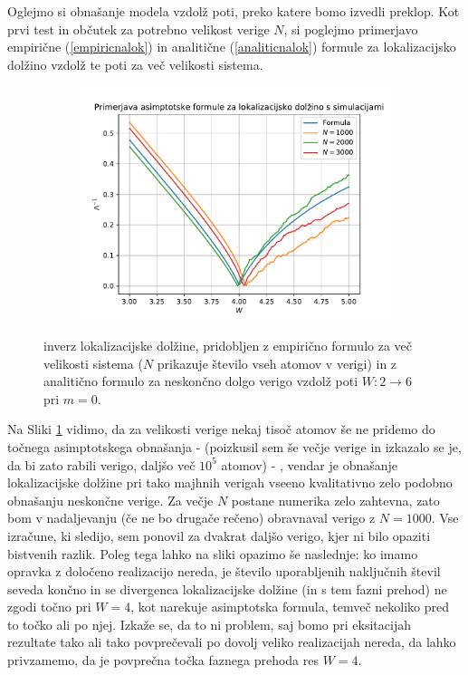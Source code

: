 Oglejmo si obnašanje modela vzdolž poti, preko katere bomo izvedli preklop. 
Kot prvi test in občutek za potrebno velikost verige $N$, si poglejmo primerjavo empirične (\ref{empiricnalok}) in analitične (\ref{analiticnalok}) formule za lokalizacijsko dolžino vzdolž te poti za več velikosti sistema.
\begin{figure}[H]
\centering
\begin{subfigure}{.7\textwidth}
\includegraphics[trim=0 0 0 38,clip,width=\linewidth]{Figures/locLength.pdf}
\end{subfigure}
\caption{inverz lokalizacijske dolžine, pridobljen z empirično formulo za več velikosti sistema ($N$ prikazuje število vseh atomov v verigi) in z analitično formulo za neskončno dolgo verigo vzdolž poti $W: 2 \to 6$ pri $m=0$.}
\label{fig:locLength}
\end{figure}
Na Sliki \ref{fig:locLength} vidimo, da za velikosti verige nekaj tisoč atomov še ne pridemo do točnega asimptotskega obnašanja - (poizkusil sem še večje verige in izkazalo se je, da bi zato rabili verigo, daljšo več $10^5$ atomov) - , vendar je obnašanje lokalizacijske dolžine pri tako majhnih verigah vseeno kvalitativno zelo podobno obnašanju neskončne verige. Za večje $N$ postane numerika zelo zahtevna, zato bom v nadaljevanju (če ne bo drugače rečeno) obravnaval verigo z $N=1000$. Vse izračune, ki sledijo, sem ponovil za dvakrat daljšo verigo, kjer ni bilo opaziti bistvenih razlik. Poleg tega lahko na sliki opazimo še naslednje: ko imamo opravka z določeno realizacijo nereda, je število uporabljenih naključnih števil seveda končno in se divergenca lokalizacijske dolžine (in s tem fazni prehod) ne zgodi točno pri $W=4$, kot narekuje asimptotska formula, temveč nekoliko pred to točko ali po njej. Izkaže se, da to ni problem, saj bomo pri eksitacijah rezultate tako ali tako povprečevali po dovolj veliko realizacijah nereda, da lahko privzamemo, da je povprečna točka faznega prehoda res $W=4$.

